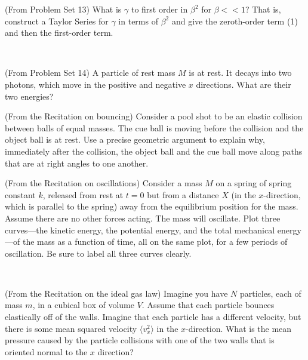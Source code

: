\documentclass[12pt, letterpaper]{article}
\begin{document}
\vfill

\begin{problem} (From Problem Set 13)
  What is $\gamma$ to first order in $\beta^2$ for $\beta<< 1$?
  That is, construct a Taylor Series for $\gamma$ in terms of
  $\beta^2$ and give the zeroth-order term (1) and then the first-order
  term.
\end{problem}

\vfill
~\clearpage

\begin{problem} (From Problem Set 14)
  A particle of rest mass $M$ is at rest.
  It decays into two photons, which move in the positive and negative $x$ directions.
  What are their two energies?
\end{problem}

\vfill

\begin{problem} (From the Recitation on bouncing)
  Consider a pool shot to be an elastic collision between balls of equal
  masses. The cue ball is moving before the collision and the object
  ball is at rest. Use a precise geometric argument to explain why,
  immediately after the collision, the
  object ball and the cue ball move along paths that are at right angles to one another.
\end{problem}

\vfill

\begin{problem} (From the Recitation on oscillations)
  Consider a mass $M$ on a spring of spring constant $k$, released from
  rest at $t=0$ but from a distance $X$ (in the $x$-direction, which is
  parallel to the spring) away from the equilibrium position for the
  mass.  Assume there are no other forces acting.
  The mass will oscillate.
  Plot three curves---the kinetic energy, the potential energy, and the total
  mechanical energy---of the mass as a function of time, all on the same plot,
  for a few periods of oscillation.
  Be sure to label all three curves clearly.
\end{problem}

\vfill
~\clearpage

\begin{problem} (From the Recitation on the ideal gas law)
  Imagine you have $N$ particles, each of mass $m$, in a cubical box of volume $V$.
  Assume that each particle bounces elastically off of the walls.
  Imagine that each particle has a different velocity, but there is some
  mean squared velocity $\langle v_x^2\rangle$ in the $x$-direction. What is the
  mean pressure caused by the particle collisions
  with one of the two walls that is oriented normal to the $x$ direction?
\end{problem}
\end{document}
